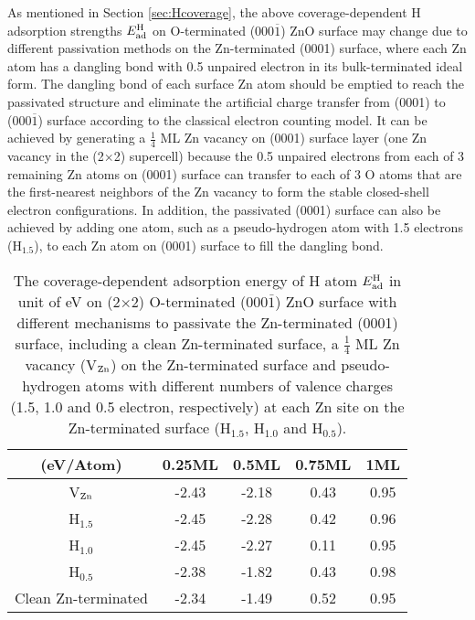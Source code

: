 
As mentioned in Section \ref{sec:Hcoverage}, the above coverage-dependent H adsorption strengths $E_{\textup{ad}}^{\textup{H}}$ on O-terminated (000$\overline{1}$) ZnO surface may change due to different passivation methods on the Zn-terminated (0001) surface, where each Zn atom has a dangling bond with 0.5 unpaired electron in its bulk-terminated ideal form. The dangling bond of each surface Zn atom should be emptied to reach the passivated structure and eliminate the artificial charge transfer from (0001) to (000$\overline{1}$) surface according to the classical electron counting model\cite{pashley1989electron}. It can be achieved by generating a  $\frac{1}{4}$ ML Zn vacancy on (0001) surface layer (one Zn vacancy in the (2$\times$2) supercell) because the 0.5 unpaired electrons from each of 3 remaining Zn atoms on (0001) surface can transfer to each of 3 O atoms that are the first-nearest neighbors of the Zn vacancy to form the stable closed-shell electron configurations. In addition, the passivated (0001) surface can also be achieved by adding one atom, such as a pseudo-hydrogen atom with 1.5 electrons (H$_{1.5}$), to each Zn atom on (0001) surface to fill the dangling bond.

\begin{table}[!htbp]
\centering
\caption[Comparison of different passivation mechanisms for the coverage-dependent adsorption energy of H atom]{The coverage-dependent adsorption energy of H atom $E_{\textup{ad}}^{\textup{H}}$ in unit of eV on (2$\times$2) O-terminated (000$\bar{1}$) ZnO surface with different mechanisms to passivate the Zn-terminated (0001) surface, including a clean Zn-terminated surface, a $\frac{1}{4}$ ML Zn vacancy (V$_{\textup{Zn}}$) on the Zn-terminated surface and pseudo-hydrogen atoms with different numbers of valence charges (1.5, 1.0 and 0.5 electron, respectively) at each Zn site on the Zn-terminated surface (H$_{1.5}$, H$_{1.0}$ and H$_{0.5}$).}
\label{tab:pass}
\begin{tabular}{ccccc}
\hline
\hline
(eV/Atom)       & 0.25ML & 0.5ML & 0.75ML & 1ML  \\ \hline
V$_{\textup{Zn}}$     & -2.43  & -2.18 & 0.43   & 0.95 \\
H$_{1.5}$         & -2.45  & -2.28 & 0.42   & 0.96 \\
H$_{1.0}$         & -2.45  & -2.27 & 0.11   & 0.95 \\
H$_{0.5}$         & -2.38  & -1.82 & 0.43   & 0.98 \\ 
Clean Zn-terminated & -2.34  & -1.49 & 0.52   & 0.95 \\
\hline
\hline
\end{tabular}
\end{table}

